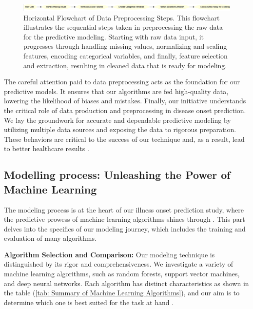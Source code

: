 \documentclass[manuscript,screen,]{acmart}
\begin{document}
\begin{figure}
    \centering
    \includegraphics[width=1\linewidth]{Images//Sections/Data Preprocessing Flow.png}
    \caption{Horizontal Flowchart of Data Preprocessing Steps. This flowchart illustrates the sequential steps taken in preprocessing the raw data for the predictive modeling. Starting with raw data input, it progresses through handling missing values, normalizing and scaling features, encoding categorical variables, and finally, feature selection and extraction, resulting in cleaned data that is ready for modeling.}
    \label{fig: Horizontal Flowchart of Data Preprocessing Steps}
\end{figure}

The careful attention paid to data preprocessing acts as the foundation for our predictive models. It ensures that our algorithms are fed high-quality data, lowering the likelihood of biases and mistakes.
Finally, our initiative understands the critical role of data production and preprocessing in disease onset prediction. We lay the groundwork for accurate and dependable predictive modeling by utilizing multiple data sources and exposing the data to rigorous preparation. These behaviors are critical to the success of our technique and, as a result, lead to better healthcare results \cite{Alexandropoulos2019DataPreprocessing}.


\subsection{Modelling process: Unleashing the Power of Machine Learning}

The modeling process is at the heart of our illness onset prediction study, where the predictive prowess of machine learning algorithms shines through \cite{Lin2020StrokeOutcomePrediction}. This part delves into the specifics of our modeling journey, which includes the training and evaluation of many algorithms.

\textbf{Algorithm Selection and Comparison:}
Our modeling technique is distinguished by its rigor and comprehensiveness. We investigate a variety of machine learning algorithms, such as random forests, support vector machines, and deep neural networks. Each algorithm has distinct characteristics as shown in the table (\ref{tab: Summary of Machine Learning Algorithms}), and our aim is to determine which one is best suited for the task at hand \cite{bracher2022machine}.
\end{document}
